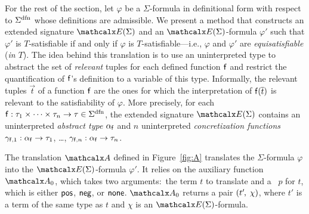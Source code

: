 For the rest of the section, let $\varphi$ be a $\Sigma$-formula
in definitional form with respect to $\sfundefs{\Sigma}$
whose definitions are admissible.
We present a method that constructs an extended signature
$\extendsig{ \Sigma }$ and an $\extendsig{ \Sigma }$-formula $\varphi'$ such that
$\varphi'$ is $T$-satisfiable if and only if $\varphi$ is $T$-satisfiable---i.e.,
$\varphi$ and $\varphi'$ are \emph{equisatisfiable} (\emph{in $T$}).
The idea behind this translation
is to use an uninterpreted type to abstract the set of
\emph{relevant} tuples for each defined function $\mathsf{f}$ and restrict the
quantification of $\mathsf{f}$'s definition to a variable of this
type. 
Informally, the relevant tuples $\vec t$ of a function $\mathsf{f}$ are the
ones for which the interpretation of $\mathsf{f}( \overline{t} )$ is relevant to the
satisfiability of $\varphi$.
More precisely,
for each $\con{f} : \tau_1 \times \cdots \times \tau_n \rightarrow \tau \in \sfundefs{\Sigma}$,
the extended signature $\extendsig{\Sigma}$ contains
an uninterpreted \emph{abstract type} $\alpha_{\mathsf{f}}$ and
$n$ uninterpreted \emph{concretization functions} $\gamma_{\mathsf{f},1} : \alpha_{\mathsf{f}} \rightarrow \tau_1$, \ldots, $\gamma_{\mathsf{f},n} : \alpha_{\mathsf{f}} \rightarrow \tau_n$.

The translation $\conv$ defined in Figure~\ref{fig:A} translates the $\Sigma$-formula
$\varphi$ into the $\extendsig{\Sigma}$-formula $\varphi'$. It relies
on the auxiliary function $\conv_0$, which takes two arguments:\ the term $t$
to translate and a ~$p$ for $t$, which is either $\mathsf{pos}$, $\mathsf{neg}$, or
$\mathsf{none}$. 
\vthinspace$\conv_0$ returns a pair $( t'\negvthinspace,\, \chi )$, where $t'$ is a term of
the same type as $t$ and $\chi$ is an $\extendsig{\Sigma}$-formula.



